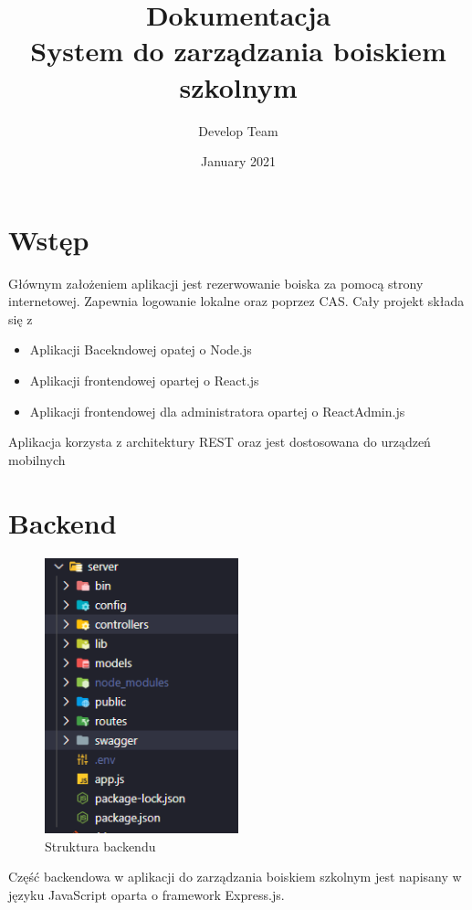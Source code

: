 \documentclass[titlepage]{article}
\title{
  \textbf{Dokumentacja} \\
  System do zarządzania boiskiem szkolnym}
\date{January 2021}
\author{Develop Team}
\begin{document}
\maketitle
\tableofcontents
\section*{Wstęp}

Głównym założeniem  aplikacji jest rezerwowanie boiska za pomocą strony internetowej. Zapewnia logowanie lokalne oraz  poprzez CAS. Cały projekt składa się z 
\begin{itemize}
  \item Aplikacji Bacekndowej opatej o Node.js
  \item Aplikacji frontendowej opartej o React.js
  \item Aplikacji frontendowej dla administratora opartej o ReactAdmin.js
\end{itemize}

Aplikacja korzysta z architektury REST oraz jest dostosowana do urządzeń mobilnych

\newpage
\section{Backend}

\begin{figure}[h]
\centering
\includegraphics[width=0.5\textwidth]{struktura.png}
\caption{Struktura backendu}
\label{fig:obrazek struktura}
\end{figure}

\indent Część backendowa w aplikacji do zarządzania boiskiem szkolnym jest napisany w języku JavaScript oparta o framework Express.js.
\end{document}
